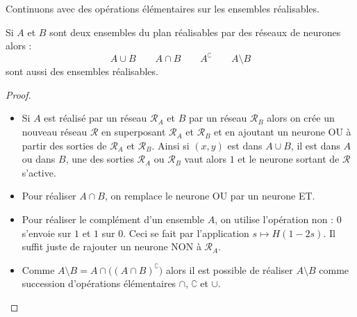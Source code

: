 Continuons avec des opérations élémentaires sur les ensembles réalisables.
\begin{proposition}{}{}
	Si $A$ et $B$ sont deux ensembles du plan réalisables par des réseaux de neurones alors :
	$$A\cup B \qquad A\cap B \qquad A^\complement  \qquad A \setminus B$$
	sont aussi des ensembles réalisables. 
\end{proposition}




\begin{proof}
	~
	\begin{itemize}
		\item Si $A$ est réalisé par un réseau $\mathcal{R}_A$ et $B$ par un réseau  $\mathcal{R}_B$
		alors on crée un nouveau réseau $\mathcal{R}$ en superposant $\mathcal{R}_A$ et $\mathcal{R}_B$
		et en ajoutant un neurone \og{}OU\fg{} à partir des sorties de $\mathcal{R}_A$ et $\mathcal{R}_B$.
		Ainsi si $(x,y)$ est dans $A \cup B$, il est dans $A$ ou dans $B$, une des sorties  $\mathcal{R}_A$ ou $\mathcal{R}_B$ vaut alors $1$ et le neurone sortant de $\mathcal{R}$ s'active.
		
		
		
		\item Pour réaliser $A \cap B$, on remplace le neurone \og{}OU\fg{} par un neurone \og{}ET\fg{}.
		
		
		\item Pour réaliser le complément d'un ensemble $A$, on utilise l'opération \og{}non\fg{} : $0$ s'envoie sur $1$ et $1$ sur $0$. Ceci se fait par l'application 
		$s \mapsto H(1-2s)$. Il suffit juste de rajouter un neurone \og{}NON\fg{} à $\mathcal{R}_A$.
		
		
		\item Comme $A \setminus B = A \cap \big((A\cap B)^\complement \big)$ alors 
		il est possible de réaliser $A \setminus B$ comme succession d'opérations élémentaires $\cap$, $\complement$ et $\cup$.
	\end{itemize}
	
	
\end{proof}







